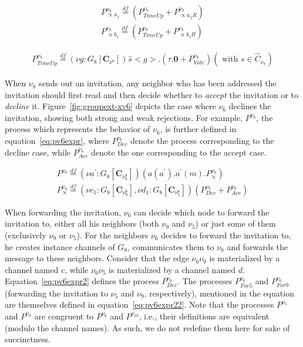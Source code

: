 \begin{equation}
	\label{eq:pv8expr4}
	\begin{gathered}
	P^{\nu_8}_{\propto a_1}\overset{df}{=}(P^{\nu_8}_{TimeUp} + P^{\nu_8}_{\propto a_1R})\\
	P^{\nu_8}_{\propto b_1}\overset{df}{=}(P^{\nu_8}_{TimeUp} + P^{\nu_8}_{\propto b_1R})
	\end{gathered}
\end{equation}

\begin{equation}
	\label{eq:pv8expr5}
	\begin{gathered}
	P^{\nu_8}_{TimeUp}\overset{df}{=}(\nu g:G_8[\mathbf{C}_{\nu^8}])\overset{-}{s}<g>.(\tau.\mathbf{0} + P^{\nu_8}_{Vote}) (\mbox{ with } s\in \hat{C}_{\nu_8})
\end{gathered}
\end{equation}

When $\nu_8$ sends out an invitation, any neighbor who has been addressed the invitation should first read and then
decide whether to \emph{accept} the invitation or to \emph{decline} it. Figure~\ref{fig:groupext-xv6} depicts the case
where $\nu_6$ declines the invitation, showing both strong and weak rejections. For example, $P^{\nu_6}$, the process
which represents the behavior of $\nu_6$, is further defined in equation~\ref{eq:pv6expr}, where $P^{\nu_6}_{Dec}$ denote
the process corresponding to the decline case, while $P^{\nu_6}_{Acc}$ denote the one corresponding to the accept case.

\begin{equation}
	\label{eq:pv6expr}
	\begin{gathered}
		P^{\nu_6} \overset{df}{=} (\nu a^\prime:G_8[\mathbf{C}_{\nu_6^8}]) (a(a^\prime).a^\prime(m).P^{\nu_6}_\propto)\\
		P^{\nu_6}_\propto \overset{df}{=} (\nu c_1:G_8[\mathbf{C}_{\nu_9^6}], \nu d_1:G_8[\mathbf{C}_{\nu_5^6}])(P^{\nu_6}_{Dec} + P^{\nu_6}_{Acc})
	\end{gathered}
\end{equation}

 When forwarding the invitation, $\nu_6$ can decide which node to forward the invitation to, either all his neighbors
(both $\nu_9$ and $\nu_5$) or just some of them (exclusively $\nu_9$ or $\nu_5$). For the neighbors $\nu_6$ decides to
forward the invitation to, he creates instance channels of $G_8$, communicates them to $\nu_8$ and forwards the message
to these neighbors. Consider that the edge $\nu_6\nu_9$ is materialized by a channel named $c$, while $\nu_6\nu_5$ is
materialized by a channel named $d$. Equation~\ref{eq:pv6expr2} defines the process $P^{\nu_6}_{Dec}$. The processes
$P^{\nu_6}_{For5}$ and $P^{\nu_6}_{For9}$ (forwarding the invitation to $\nu_5$ and $\nu_9$, respectively), mentioned in
the equation are themselves defined in equation~\ref{eq:pv6expr22}. Note that the processes $P^{\nu_5}$ and $P^{\nu_9}$
are congruent to $P^{\nu_6}$ and $P^{\nu_{10}}$, i.e., their definitions are equivalent (modulo the channel names). As
such, we do not redefine them here for sake of succinctness.


